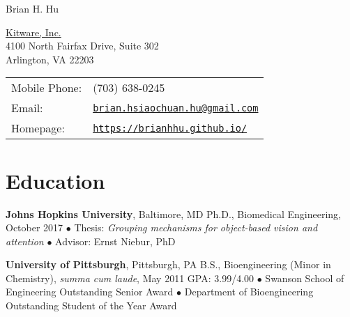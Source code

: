 \documentclass[10pt,letterpaper]{article}
\def\name{Brian H. Hu}
\renewenvironment{itemize}{
  \begin{list}{}{
    \setlength{\leftmargin}{1.5em}
    \setlength{\itemsep}{0.25em}
    \setlength{\parskip}{0pt}
    \setlength{\parsep}{0.25em}
  }
}{
  \end{list}
}
\begin{document}
{\huge \name}


\vspace{0.25in}

\begin{minipage}{0.475\linewidth}
  \href{https://www.kitware.com/about/}{Kitware, Inc.} \\
  4100 North Fairfax Drive, Suite 302 \\
  Arlington, VA 22203
\end{minipage}
\begin{minipage}{0.52\linewidth}
  \begin{tabular}{ll}
    Mobile Phone: & (703) 638-0245 \\
    Email: & \href{mailto:brian.hsiaochuan.hu@gmail.com}{\tt brian.hsiaochuan.hu@gmail.com} \\
    Homepage: & \href{https://brianhhu.github.io/}{\tt https://brianhhu.github.io/} \\
  \end{tabular}
\end{minipage}

\section*{Education}
\vspace{-0.05in}
\begin{itemize}
  \item \textbf{Johns Hopkins University}, Baltimore, MD
  \subitem Ph.D., Biomedical Engineering, October 2017
  \subitem$\bullet$ Thesis: \textit{Grouping mechanisms for object-based vision and attention}
  \subitem$\bullet$ Advisor: Ernst Niebur, PhD
  
  \item \textbf{University of Pittsburgh}, Pittsburgh, PA
  \subitem B.S., Bioengineering (Minor in Chemistry), \textit{summa cum laude}, May 2011
  \subitem GPA: 3.99/4.00
  \vspace{0.05in}
  \subitem$\bullet$ Swanson School of Engineering Outstanding Senior Award
  \subitem$\bullet$ Department of Bioengineering Outstanding Student of the Year Award
\end{itemize}

\vspace{-0.25in}
\end{document}
